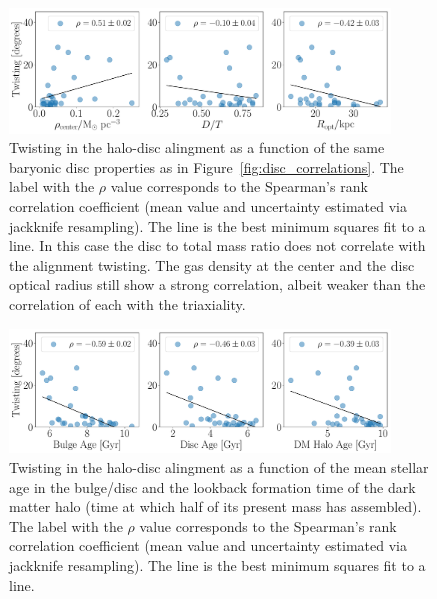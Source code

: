 \documentclass[usenatbib]{mnras}
\begin{document}
\begin{figure}
\begin{center}
\includegraphics[width=0.9\textwidth]{correlations_angles_alignment_MHD.pdf}
\end{center}
\caption{Twisting in the halo-disc alingment as a function of the same
  baryonic disc properties as in Figure~\ref{fig:disc_correlations}.
  The label with the $\rho$ value corresponds to the Spearman's rank
  correlation coefficient (mean value and uncertainty estimated via
  jackknife resampling).
  The line is the best minimum squares fit to a line.
  In this case the disc to total mass ratio does not correlate with the alignment twisting.
  The gas density at the center and the disc optical radius still show
  a strong correlation, albeit weaker than the correlation of each with the triaxiality.}
\label{fig:twisting_correlations}
\end{figure}


\begin{figure}
\begin{center}
\includegraphics[width=0.9\textwidth]{correlations_ages_angles_alignment_MHD.pdf}
\end{center}
\caption{Twisting in the halo-disc alingment as a function of the
  mean stellar age in the bulge/disc and the lookback formation time of the
  dark matter halo (time at which half of its present mass has assembled).
  The label with the $\rho$ value corresponds to the Spearman's rank
  correlation coefficient (mean value and uncertainty estimated via
  jackknife resampling).
  The line is the best minimum squares fit to a line.}
\label{fig:twisting_age}
\end{figure}
\end{document}
